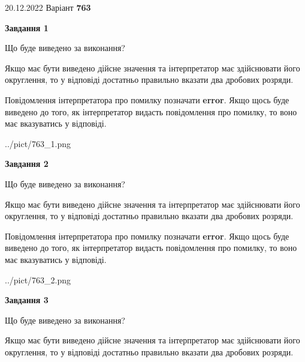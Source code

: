 \documentclass[12pt, ukrainian]{article}
\begin{document}
{20.12.2022 Варіант \No \textbf { 763 }\par}
{
\begin {Large}

{\begin {center}\textbf{Завдання 1}\end {center}}\par
Що буде виведено за виконання? \par

Якщо має бути виведено дійсне значення та інтерпретатор має здійснювати його округлення, 
то у відповіді достатньо правильно вказати два дробових розряди.

Повідомлення інтерпретатора про помилку позначати \textbf{error}.
Якщо щось буде виведено до того, як інтерпретатор видасть повідомлення про помилку, 
то воно має вказуватись у відповіді. \par

\begin{center}
	{../pict/763_1.png}
\end{center}
\newpage

{\begin {center}\textbf{Завдання 2}\end {center}}\par
Що буде виведено за виконання? \par

Якщо має бути виведено дійсне значення та інтерпретатор має здійснювати його округлення, 
то у відповіді достатньо правильно вказати два дробових розряди.

Повідомлення інтерпретатора про помилку позначати \textbf{error}.
Якщо щось буде виведено до того, як інтерпретатор видасть повідомлення про помилку, 
то воно має вказуватись у відповіді. \par

\begin{center}
	{../pict/763_2.png}
\end{center}
\newpage

{\begin {center}\textbf{Завдання 3}\end {center}}\par
Що буде виведено за виконання? \par

Якщо має бути виведено дійсне значення та інтерпретатор має здійснювати його округлення, 
то у відповіді достатньо правильно вказати два дробових розряди.


\end{Large}}
\end{document}
